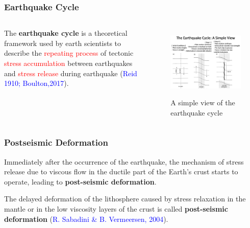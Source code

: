 ﻿\documentclass{beamer}
\begin{document}
\begin{frame}
\frametitle{Earthquake Cycle}

\begin{columns}[c] %

The \textbf{earthquake cycle} is a theoretical framework used by earth scientists to describe the \textcolor{red}{repeating process} of tectonic \textcolor{red}{stress accumulation} between earthquakes and \textcolor{red}{stress release} during earthquake (\textcolor{blue}{Reid 1910; Boulton,2017}).

\begin{figure}
  \centering
  \includegraphics[scale=0.25]{./pic/earthquake_cycle_simple.jpg}\\
  \caption{A simple view of the earthquake cycle}\label{fig_okada}
\end{figure}

\end{columns}

\end{frame}

\begin{frame}
\frametitle{Postseismic Deformation}
Immediately after the occurrence of the earthquake, the mechanism of stress release due to viscous flow in the ductile part of the Earth’s crust starts to operate, leading to \textbf{post-seismic deformation}.

The delayed deformation of the lithosphere caused by stress relaxation in the mantle or in the low viscosity layers of the crust is called \textbf{post-seismic deformation} (\textcolor{blue}{R. Sabadini \& B. Vermeersen, 2004}).
\end{frame}
\end{document}
